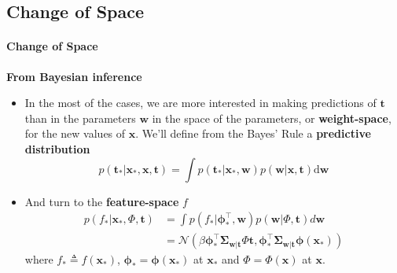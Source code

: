\subsection{Change of Space}
\begin{frame}{\insertsection}
    \framesubtitle{Change of Space} 

    \textcolor{UniGold}{\textbf{From Bayesian inference}}
    \begin{itemize}
        \item In the most of the cases, we are more interested in making predictions of $\mathbf{t}$ than in the parameters $\mathbf{w}$ in the space of the parameters, or \textcolor{UniOrange}{\textbf{weight-space}}, for the new values of $\mathbf{x}$. We'll define from the Bayes' Rule a \textcolor{UniOrange}{\textbf{predictive distribution}} $$p(\mathbf{t}_{*} | \mathbf{x}_{*}, \mathbf{x}, \mathbf{t})=\displaystyle\int p(\mathbf{t}_{*} | \mathbf{x}_{*}, \mathbf{w}) p(\mathbf{w} | \mathbf{x}, \mathbf{t}) \mathrm{d} \mathbf{w}$$
        \item And turn to the \textcolor{UniOrange}{\textbf{feature-space}} $f$
    \begin{equation*}
       \begin{aligned} p\left(f_{*} | \mathbf{x}_{*}, \Phi, \mathbf{t}\right) &=\int p(f_{*} | \boldsymbol{\phi}^\top_*, \mathbf{w}) p(\mathbf{w} | \Phi, \mathbf{t}) d \mathbf{w} \\ &=\mathcal{N}\left(\beta \boldsymbol{\phi}^{\top}_* \boldsymbol{\Sigma}_{\mathbf{w}|\mathbf{t}} \Phi \mathbf{t}, \boldsymbol{\phi}^{\top}_* \boldsymbol{\Sigma}_{\mathbf{w}|\mathbf{t}} \boldsymbol{\phi}(\mathbf{x}_{*})\right) \end{aligned} 
    \end{equation*}
	where $f_{*} \triangleq f\left(\mathbf{x}_{*}\right)$, $\boldsymbol{\phi}_* = \boldsymbol{\phi}(\mathbf{x}_*) $ at $\mathbf{x}_{*}$ and $\Phi = \Phi(\mathbf{x})$ at $\mathbf{x}$.
    \end{itemize}
\end{frame}


